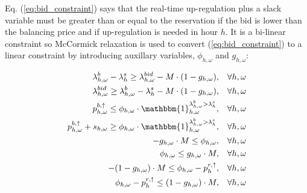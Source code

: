 Eq. (\ref{eq:bid_constraint}) says that the real-time up-regulation plus a slack variable must be greater than or equal to the reservation if the bid is lower than the balancing price and if up-regulation is needed in hour $h$. It is a bi-linear constraint so McCormick relaxation is used to convert (\ref{eq:bid_constraint}) to a linear constraint by introducing auxillary variables, $\phi_{h,\omega}$ and $g_{h,\omega}$:

\begin{subequations}\label{eq:bid_constraint_relaxed}
    \begin{align}
        \lambda_{h,\omega}^{b} - \lambda_{h}^{s} \geq \lambda_{h,\omega}^{bid} - M \cdot (1 - g_{h,\omega}) , \quad                                   & \forall{h,\omega}             \label{con_bid:subeq1} \\
        \lambda_{h,\omega}^{bid} \geq \lambda_{h,\omega}^{b} - \lambda_{h}^{s} - M \cdot (1 - g_{h,\omega}) , \quad                                   & \forall{h,\omega}             \label{con_bid:subeq2} \\
        p^{b, \uparrow}_{h,\omega} \leq \phi_{h,\omega} \cdot \mathbbm{1}_{h,\omega}^{\lambda^{b}_{h,\omega} > \lambda^{s}_{h}}, \quad                & \forall{{h,\omega}}           \label{con_bid:subeq3} \\
        p^{b, \uparrow}_{h,\omega} + s_{h,\omega} \geq \phi_{h,\omega} \cdot \mathbbm{1}_{h,\omega}^{\lambda^{b}_{h,\omega} > \lambda^{s}_{h}}, \quad & \forall{{h,\omega}}           \label{con_bid:subeq4} \\
        -g_{h,\omega} \cdot M \leq \phi_{h,\omega}, \quad                                                                                             & \forall{h,\omega}             \label{con_bid:subeq5} \\
        \phi_{h,\omega} \leq g_{h,\omega} \cdot M, \quad                                                                                              & \forall{h,\omega}             \label{con_bid:subeq6} \\
        -(1 - g_{h,\omega}) \cdot M \leq \phi_{h,\omega} - p^{r,\uparrow}_{h}, \quad                                                                  & \forall{h,\omega}             \label{con_bid:subeq7} \\
        \phi_{h,\omega} - p^{r,\uparrow}_{h} \leq (1 - g_{h,\omega}) \cdot M, \quad                                                                   & \forall{h,\omega}             \label{con_bid:subeq8}
    \end{align}
\end{subequations}

